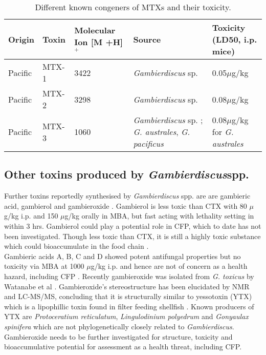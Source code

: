 \documentclass[12pt]{article}
\begin{document}
\begin{table}
\caption{Different known congeners of MTXs and their toxicity.}
\label{tbl:MTXTable}
\begin{tabular}{ |  p{2cm} | p{2cm} | p{3cm} | p{3cm} | p{4cm} | }
\hline
\textbf{Origin} & \textbf{Toxin} & \textbf{Molecular Ion [M +H]$^{+}$} & \textbf{Source} & \textbf{Toxicity (LD50, i.p. mice)} \\
\hline
 Pacific & MTX-1 & 3422 \cite{holmes1994purification,murata1993structure} & \emph{Gambierdiscus} sp. \cite{holmes1994purification} & 0.05$\mu$g/kg \cite{murata1993structure}\\
 \hline
 Pacific & MTX-2 & 3298 \cite{holmes1994purification} & \emph{Gambierdiscus} sp. \cite{holmes1994purification} & 0.08$\mu$g/kg \cite{holmes1994purification}\\
 \hline
 Pacific & MTX-3 & 1060   \cite{holmes1994purification} & \emph{Gambierdiscus} sp. \cite{holmes1994purification}; \emph{G. australes}, \emph{G. pacificus} \cite{rhodes2014production} &  0.08$\mu$g/kg for \emph{G. australes}  \cite{rhodes2014production} \\
 \hline
\end{tabular}
\end{table}
\FloatBarrier
\subsection{Other toxins produced by \emph{Gambierdiscus}spp.}
Further toxins reportedly synthesised by \emph{Gambierdiscus} spp. are are gambieric acid, gambierol and gambieroxide \cite{watanabe2013gambieroxide,satake1993gambierol,nagai1992gambieric}.
Gambierol is less toxic than CTX with 80 $\mu$g/kg i.p. and 150 $\mu$g/kg orally in MBA, but fast acting with lethality setting in within 3 hrs\cite{ito2003pathological}. Gambierol could play a potential role in CFP, which to date has not been investigated. Though less toxic than CTX, it is still a highly toxic substance which could bioaccumulate in the food chain \cite{rhodes2014production}.\\
Gambieric acids A, B, C and D showed potent antifungal properties but no toxicity via MBA at 1000 $\mu$g/kg i.p. and hence are not of concern as a health hazard, including CFP \cite{rhodes2014production,nagai1992gambieric}.
Recently gambieroxide was isolated from \emph{G. toxicus} by Watanabe et al \cite{watanabe2013gambieroxide}. Gambieroxide's stereostructure has been elucidated by NMR and LC-MS/MS, concluding that it is structurally similar to yessotoxin (YTX) which is a lipophillic toxin found in filter feeding shellfish  \cite{tubaro2010yessotoxins}. Known producers of YTX are \emph{Protoceratium reticulatum}, \emph{Lingulodinium polyedrum} and \emph{Gonyaulax spinifera} \cite{tubaro2010yessotoxins} which are not  phylogenetically closely related to \emph{Gambierdiscus}.  Gambieroxide needs to be further investigated for structure, toxicity and bioaccumulative potential for assessment as a health threat, including CFP. \\
\end{document}
